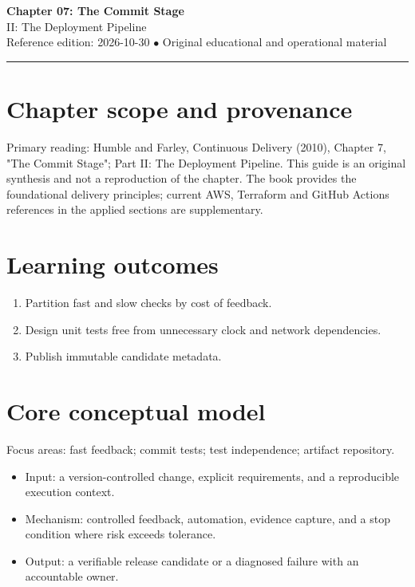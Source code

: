 \documentclass[10pt,letterpaper]{article}
\begin{document}
\begin{center}
{\LARGE\bfseries\color{cdblue}Chapter 07: The Commit Stage}\\[7pt]
{\large II: The Deployment Pipeline}\\[6pt]
{\small Reference edition: 2026-10-30 $\bullet$ Original educational and operational material}
\end{center}
\noindent\color{cdblue}\rule{\linewidth}{1.2pt}\color{black}
\vspace{0.4em}
\section{Chapter scope and provenance}
Primary reading: Humble and Farley, Continuous Delivery (2010), Chapter 7, "The Commit Stage"; Part II: The Deployment Pipeline. This guide is an original synthesis and not a reproduction of the chapter. The book provides the foundational delivery principles; current AWS, Terraform and GitHub Actions references in the applied sections are supplementary.


\section{Learning outcomes}
\begin{enumerate}
\item Partition fast and slow checks by cost of feedback.
\item Design unit tests free from unnecessary clock and network dependencies.
\item Publish immutable candidate metadata.
\end{enumerate}

\section{Core conceptual model}
Focus areas: fast feedback; commit tests; test independence; artifact repository.

\begin{itemize}
\item Input: a version-controlled change, explicit requirements, and a reproducible execution context.
\item Mechanism: controlled feedback, automation, evidence capture, and a stop condition where risk exceeds tolerance.
\item Output: a verifiable release candidate or a diagnosed failure with an accountable owner.
\end{itemize}
\end{document}
